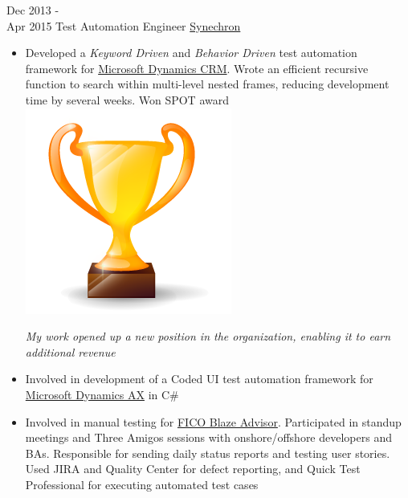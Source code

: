 \documentclass[letterpaper,UTF8]{twentysecondcv} %
\begin{document}
\begin{twenty}
     \twentyitem
   		{Dec 2013 - \\ Apr 2015}
        {Test Automation Engineer}
        {\href{http://www.synechron.com/}{Synechron}}
        {}
        {
        \begin{itemize}
        \item Developed a \textit{Keyword Driven} and \textit{Behavior Driven} test automation framework for \href{https://www.microsoft.com/en-ca/dynamics/crm.aspx}{Microsoft Dynamics CRM}. Wrote an efficient recursive function to search within multi-level nested frames, reducing development time by several weeks. Won SPOT award {\includegraphics[scale=0.05]{img/trophy.png}}
        
        \textit{My work opened up a new position in the organization, enabling it to earn additional revenue}
        \item Involved in development of a Coded UI test automation framework for \href{https://www.microsoft.com/en-ca/dynamics/erp-ax-overview.aspx}{Microsoft Dynamics AX} in C\#
        \item Involved in manual testing for \href{http://www.fico.com/en/products/fico-blaze-advisor-decision-rules-management-system}{FICO Blaze Advisor}. Participated in standup meetings and Three Amigos sessions with onshore/offshore developers and BAs. Responsible for sending daily status reports and testing user stories. Used JIRA and Quality Center for defect reporting, and Quick Test Professional for executing automated test cases
    \end{itemize}
    	}
        
\end{twenty}
\end{document}
